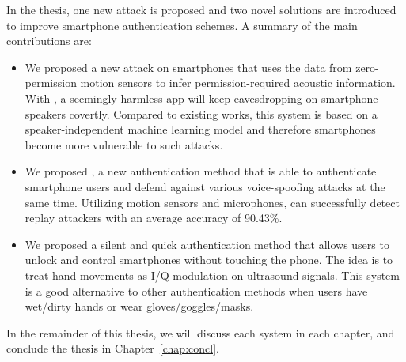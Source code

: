 	In the thesis, one new attack is proposed and two novel solutions are introduced to improve smartphone authentication schemes. A summary of the main  contributions are:
	\begin{itemize}
		\item We proposed a new attack on smartphones that uses the data from zero-permission motion sensors to infer permission-required acoustic information. With {\spp}, a seemingly harmless app will keep eavesdropping on smartphone speakers covertly. Compared to existing works, this {\spp} system is based on a speaker-independent machine learning model and therefore smartphones become more vulnerable to such attacks.
		
		\item We proposed {\mv}, a new authentication method that is able to authenticate smartphone users and defend against various voice-spoofing attacks at the same time. Utilizing motion sensors and microphones, {\mv} can successfully detect replay attackers with an average accuracy of 90.43\%. 
		
		\item We proposed a silent and quick authentication method {\uu} that allows users to unlock and control smartphones without touching the phone. The idea is to treat hand movements as I/Q modulation on ultrasound signals. This system is a good alternative to other authentication methods when users have wet/dirty hands or wear gloves/goggles/masks.
	\end{itemize}




In the remainder of this thesis, we will discuss each system in each chapter, and conclude the thesis in Chapter~\ref{chap:concl}. 

